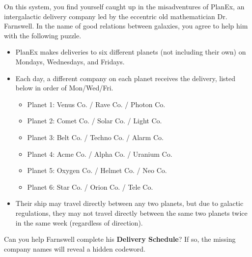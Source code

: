 On this system, you find yourself caught up in the misadventures of
PlanEx, an
intergalactic delivery company led by the eccentric old mathematician
Dr. Farnswell. In the name of good relations between galaxies, you
agree to help him with the following puzzle. 

\begin{itemize}
\item PlanEx makes deliveries
to six different planets (not including their own) on Mondays, Wednesdays,
and Fridays. 
\item Each day, a different company on each planet receives the
delivery, listed below in order of Mon/Wed/Fri.
\begin{itemize}
\item Planet 1: Venus Co. / Rave Co. / Photon Co.
\item Planet 2: Comet Co. / Solar Co. / Light Co.
\item Planet 3: Belt Co. / Techno Co. / Alarm Co.
\item Planet 4: Acme Co. / Alpha Co. / Uranium Co.
\item Planet 5: Oxygen Co. / Helmet Co. / Neo Co.
\item Planet 6: Star Co. / Orion Co. / Tele Co.
\end{itemize}
\item Their ship may travel directly between any two planets,
  but due to galactic regulations, they may not travel directly
  between the same two planets twice in the same week (regardless
  of direction).
\end{itemize}

Can you help Farnswell complete his \textbf{Delivery Schedule}? If so,
the missing company names will reveal a hidden codeword. 

\begin{center}
\end{center} 
